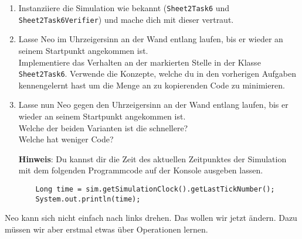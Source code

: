 

\begin{enumerate}
    \item Instanziiere die Simulation wie bekannt (\lstinline{Sheet2Task6} und \lstinline{Sheet2Task6Verifier}) und mache dich mit dieser vertraut.
    \item Lasse Neo im Uhrzeigersinn an der Wand entlang laufen, bis er wieder an seinem Startpunkt angekommen ist.\\
    Implementiere das Verhalten an der markierten Stelle in der Klasse \lstinline{Sheet2Task6}. Verwende die Konzepte, welche du in den vorherigen Aufgaben kennengelernt hast um die Menge an zu kopierenden Code zu minimieren.
    \item Lasse nun Neo gegen den Uhrzeigersinn an der Wand entlang laufen, bis er wieder an seinem Startpunkt angekommen ist.\\
    Welche der beiden Varianten ist die schnellere?\\
    Welche hat weniger Code?
    
    \textbf{Hinweis}: Du kannst dir die Zeit des aktuellen Zeitpunktes der Simulation mit dem folgenden Programmcode auf der Konsole ausgeben lassen.

        \begin{lstlisting}
    Long time = sim.getSimulationClock().getLastTickNumber();
    System.out.println(time);
        \end{lstlisting}

        
\end{enumerate}

        Neo kann sich nicht einfach nach links drehen.
        Das wollen wir jetzt ändern.
        Dazu müssen wir aber erstmal etwas über Operationen lernen.


